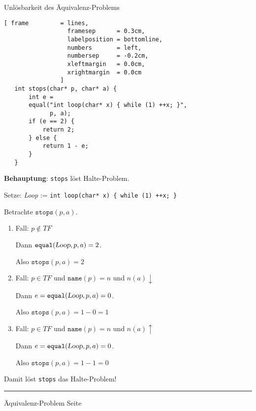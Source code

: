 \documentclass{slides}
\newcounter{mypage}
\begin{document}

\begin{slide}{}
\normalsize

\begin{center}
Unl\"osbarkeit des Äquivalenz-Problems
\end{center}
\vspace*{0.5cm}

\footnotesize
\begin{Verbatim}[ frame         = lines, 
                  framesep      = 0.3cm, 
                  labelposition = bottomline,
                  numbers       = left,
                  numbersep     = -0.2cm,
                  xleftmargin   = 0.0cm,
                  xrightmargin  = 0.0cm
                ]
   int stops(char* p, char* a) {
       int e = 
       equal("int loop(char* x) { while (1) ++x; }", 
             p, a);
       if (e == 2) {
           return 2;
       } else {
           return 1 - e;
       }
   }
\end{Verbatim}

\textbf{Behauptung}: \texttt{stops} l\"ost Halte-Problem.

Setze: \textsl{Loop} := \texttt{int loop(char* x) \{ while (1) ++x; \}}

Betrachte $\texttt{stops}(p, a)$.
\begin{enumerate}
\item Fall: $p \not\in T\!F$

      Dann $\texttt{equal}(\textsl{Loop}, p, a) = 2$.

      Also $\texttt{stops}(p,a) = 2$
\item Fall: $p \in T\!F$ und $\mathtt{name}(p) = n$ und $n(a) \downarrow$

      Dann $e = \mathtt{equal}(\textsl{Loop}, p, a) = 0$.

      Also $\texttt{stops}(p,a) = 1 - 0 = 1$
\item Fall: $p \in T\!F$ und $\mathtt{name}(p) = n$ und $n(a)\uparrow$

      Dann $e = \mathtt{equal}(\textsl{Loop}, p, a) = 0$.

      Also $\texttt{stops}(p,a) = 1 - 1 = 0$
\end{enumerate}
Damit l\"ost \texttt{stops} das Halte-Problem!

\vspace*{\fill}
\tiny \addtocounter{mypage}{1}
\rule{17cm}{1mm}
Äquivalenz-Problem  \hspace*{\fill} Seite 
\end{slide}
\end{document}

